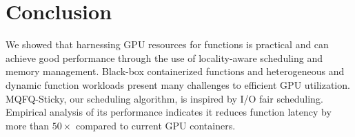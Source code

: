 \begin{comment}

\section{Future Work}

\begin{enumerate}
  \item Integrate more fine-grained GPU compute control~\cite{strati2024orion}.
  Individual kernel launches can be intercepted, and the used number of GPU threads/blocks check and/or modified.
  \item cluster load balancing of GPU invokes
\end{enumerate}

\end{comment}

\vspace*{-.5cm}
\section{Conclusion}

We showed that harnessing GPU resources for functions is practical and can achieve good performance through the use of locality-aware scheduling and memory management.
Black-box containerized functions and heterogeneous and dynamic function workloads present many challenges to efficient GPU utilization. 
MQFQ-Sticky, our scheduling algorithm, is inspired by I/O fair scheduling. Empirical analysis of its performance indicates it reduces function latency by more than $50\times$ compared to current GPU containers. 

